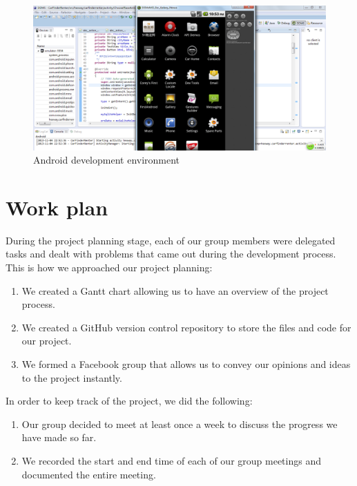 \documentclass[10pt,a4paper,oneside]{report}
\begin{document}
\begin{figure}[H]
 \caption{Android development environment}
 \centering
 \includegraphics[keepaspectratio, width=\textwidth]{androiddev.png}
\end{figure}

\section*{Work plan}
During the project planning stage, each of our group members were delegated tasks and dealt with problems that came out during the development process.
This is how we approached our project planning:
\begin{enumerate}
\item{We created a Gantt chart allowing us to have an overview of the project process.}
\item{We created a GitHub version control repository to store the files and code for our project.}
\item{We formed a Facebook group that allows us to convey our opinions and ideas to the project instantly.}
\end{enumerate}
In order to keep track of the project, we did the following:
\begin{enumerate}
\item{Our group decided to meet at least once a week to discuss the progress we have made so far.}
\item{We recorded the start and end time of each of our group meetings and documented the entire meeting.}
\end{enumerate}
\end{document}
